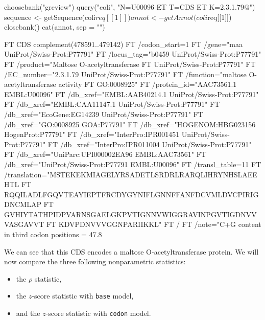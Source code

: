 \documentclass{article}
\begin{document}
\begin{Schunk}
\begin{Sinput}
 choosebank("greview")
 query("coli", "N=U00096 ET T=CDS ET K=2.3.1.79@")
 sequence <- getSequence(coli$req[[1]])
 annot <- getAnnot(coli$req[[1]])
 closebank()
 cat(annot, sep = "\n")
\end{Sinput}
\begin{Soutput}
FT   CDS             complement(478591..479142)
FT                   /codon_start=1
FT                   /gene="maa {UniProt/Swiss-Prot:P77791}"
FT                   /locus_tag="b0459 {UniProt/Swiss-Prot:P77791}"
FT                   /product="Maltose O-acetyltransferase
FT                   {UniProt/Swiss-Prot:P77791}"
FT                   /EC_number="2.3.1.79 {UniProt/Swiss-Prot:P77791}"
FT                   /function="maltose O-acetyltransferase activity
FT                   {GO:0008925}"
FT                   /protein_id="AAC73561.1 {EMBL:U00096}"
FT                   /db_xref="EMBL:AAB40214.1 {UniProt/Swiss-Prot:P77791}"
FT                   /db_xref="EMBL:CAA11147.1 {UniProt/Swiss-Prot:P77791}"
FT                   /db_xref="EcoGene:EG14239 {UniProt/Swiss-Prot:P77791}"
FT                   /db_xref="GO:0008925 {GOA:P77791}"
FT                   /db_xref="HOGENOM:HBG023156 {HogenProt:P77791}"
FT                   /db_xref="InterPro:IPR001451 {UniProt/Swiss-Prot:P77791}"
FT                   /db_xref="InterPro:IPR011004 {UniProt/Swiss-Prot:P77791}"
FT                   /db_xref="UniParc:UPI000002EA96 {EMBL:AAC73561}"
FT                   /db_xref="UniProt/Swiss-Prot:P77791 {EMBL:U00096}"
FT                   /transl_table=11
FT                   /translation="MSTEKEKMIAGELYRSADETLSRDRLRARQLIHRYNHSLAEEHTL
FT                   RQQILADLFGQVTEAYIEPTFRCDYGYNIFLGNNFFANFDCVMLDVCPIRIGDNCMLAP
FT                   GVHIYTATHPIDPVARNSGAELGKPVTIGNNVWIGGRAVINPGVTIGDNVVVASGAVVT
FT                   KDVPDNVVVGGNPARIIKKL"
FT                   /%
FT                   /note="C+G content in third codon positions = 47.8 %
\end{Soutput}
\end{Schunk}

We can see
that this CDS encodes a maltose O-acetyltransferase protein. 
We will now compare the three
following nonparametric statistics:

\begin{itemize}
\item the $\rho$ statistic,
\item the $z$-score statistic with \texttt{base} model,
\item and the $z$-score statistic with \texttt{codon} model.
\end{itemize}
\end{document}
